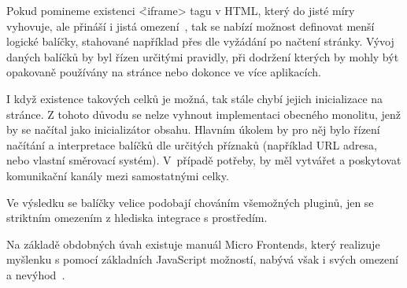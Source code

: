 Pokud pomineme existenci \h{<iframe>} tagu v HTML, který do jisté míry vyhovuje, ale přináší i jistá omezení~\cite{iframes}, tak se nabízí možnost definovat menší logické balíčky, stahované například přes  dle vyžádání po načtení stránky.
Vývoj daných balíčků by byl řízen určitými pravidly, při dodržení kterých by mohly být opakovaně používány na stránce nebo dokonce ve více aplikacích.

I když existence takových celků je možná, tak stále chybí jejich inicializace na stránce.
Z tohoto důvodu se nelze vyhnout implementaci obecného monolitu, jenž by se načítal jako inicializátor obsahu.
Hlavním úkolem by pro něj bylo řízení načítání a interpretace balíčků dle určitých příznaků (například URL adresa, nebo vlastní směrovací systém).
V~případě potřeby, by měl vytvářet a poskytovat komunikační kanály mezi samostatnými celky.

Ve výsledku se balíčky velice podobají chováním všemožných pluginů, jen se striktním omezením z hlediska integrace s prostředím.

Na základě obdobných úvah existuje manuál Micro Frontends, který realizuje myšlenku s pomocí základních JavaScript možností, nabývá však i svých omezení a nevýhod~\cite{microfrontends}.
